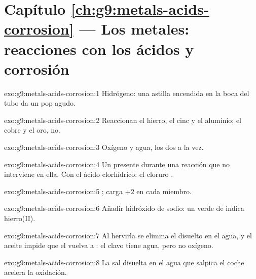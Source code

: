 \section*{Capítulo \ref{ch:g9:metals-acids-corrosion} --- Los metales: reacciones con los ácidos y corrosión}

\begin{solution}{exo:g9:metals-acids-corrosion:1}
Hidrógeno: una astilla encendida en la boca del tubo da un pop agudo.
\end{solution}

\begin{solution}{exo:g9:metals-acids-corrosion:2}
Reaccionan el hierro, el cinc y el aluminio; el cobre y el oro, no.
\end{solution}

\begin{solution}{exo:g9:metals-acids-corrosion:3}
Oxígeno y agua, los dos a la vez.
\end{solution}

\begin{solution}{exo:g9:metals-acids-corrosion:4}
Un  presente durante una reacción que no interviene en ella. Con el
ácido clorhídrico: el  cloruro .
\end{solution}

\begin{solution}{exo:g9:metals-acids-corrosion:5}
; carga $+2$ en cada miembro.
\end{solution}

\begin{solution}{exo:g9:metals-acids-corrosion:6}
Añadir hidróxido de sodio: un  verde de  indica
 hierro(II).
\end{solution}

\begin{solution}{exo:g9:metals-acids-corrosion:7}
Al hervirla se elimina el  disuelto en el agua, y el aceite impide
que el  vuelva a : el clavo tiene agua, pero no oxígeno.
\end{solution}

\begin{solution}{exo:g9:metals-acids-corrosion:8}
La sal disuelta en el agua que salpica el coche acelera la oxidación.
\end{solution}

